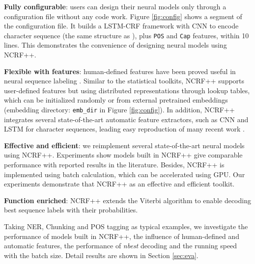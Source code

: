 \documentclass[11pt,a4paper]{article}
\begin{document}
\noindent \textbullet  \textbf{Fully configurable}: users can design their neural models only through a configuration file without any code work. Figure \ref{fig:config} shows a segment of the configuration file. It builds a LSTM-CRF framework with CNN to encode character sequence (the same structure as ), plus \texttt{POS} and \texttt{Cap} features, within 10 lines. This demonstrates the convenience of designing neural models using NCRF++.

\noindent \textbullet  \textbf{Flexible with features}: human-defined features have been proved useful in neural sequence labeling \cite{collobert2011natural,chiu2015named}. Similar to the statistical toolkits, NCRF++ supports user-defined features but using distributed representations through lookup tables, which can be initialized randomly or from external pretrained embeddings (embedding directory: \texttt{emb\_dir} in Figure \ref{fig:config}). In addition, NCRF++ integrates several state-of-the-art automatic feature extractors, such as CNN and LSTM for character sequences, leading easy reproduction of many recent work \cite{lample2016neural,chiu2015named,ma2016end}.

\noindent \textbullet  \textbf{Effective and efficient}: we reimplement several state-of-the-art neural models \cite{lample2016neural,ma2016end} using NCRF++. Experiments show models built in NCRF++ give comparable performance with reported results in the literature. Besides, NCRF++ is implemented using batch calculation, which can be accelerated using GPU. Our experiments demonstrate that NCRF++ as an effective and efficient toolkit.

\noindent \textbullet  \textbf{Function enriched}: NCRF++ extends the Viterbi algorithm \cite{viterbi1967error} to enable decoding  best sequence labels with their probabilities.

Taking NER, Chunking and POS tagging as typical examples, we investigate the performance of models built in NCRF++, the influence of human-defined and automatic features, the performance of \textit{nbest} decoding and the running speed with the batch size. Detail results are shown in Section \ref{sec:eva}.
\end{document}
